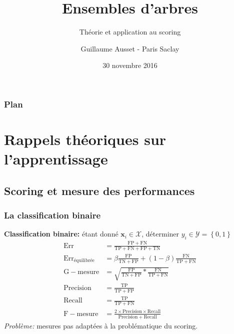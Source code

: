 \documentclass[dvipsnames,10pt]{beamer}
\title{Ensembles d'arbres}
\subtitle{Théorie et application au scoring}
\author{Guillaume Ausset - Paris Saclay}
\institute{M2 MASEF - Crédit Agricole GRO}
\date{30 novembre 2016}
\theoremstyle{plain}
\theoremstyle{definition}
\begin{document}

\begin{frame}
    \titlepage
\end{frame}


\begin{frame}
\frametitle{Plan}
    \vspace{0.2cm}
    \tableofcontents
\end{frame}

\section{Rappels théoriques sur l'apprentissage}
\subsection{Scoring et mesure des performances}

\begin{frame}
\frametitle{La classification binaire}
\textbf{Classification binaire:} étant donné $\mathbf{x}_i \in \mathcal{X}$, déterminer $y_i \in \mathcal{Y} = \left\{0,1\right\}$
\begin{align*}
    \mathrm{Err} &= \frac{\mathrm{FP}+\mathrm{FN}}{\mathrm{TP}+\mathrm{FN}+\mathrm{FP}+\mathrm{TN}} \\
    \mathrm{Err}_\mathrm{équilibrée} &= \beta \frac{\mathrm{FP}}{\mathrm{TN}+\mathrm{FP}} + (1-\beta) \frac{\mathrm{FN}}{\mathrm{TP}+\mathrm{FN}} \\
    \mathrm{G-mesure} &= \sqrt{\frac{\mathrm{FP}}{\mathrm{TN}+\mathrm{FP}} * \frac{\mathrm{FN}}{\mathrm{TP}+\mathrm{FN}}} \\
    \mathrm{Precision} &= \frac{\mathrm{TP}}{\mathrm{TP} + \mathrm{FP}} \\
    \mathrm{Recall} &= \frac{\mathrm{TP}}{\mathrm{TP} + \mathrm{FN}} \\
    \mathrm{F-mesure} &= \frac{2 \times \mathrm{Precision} \times \mathrm{Recall}}{\mathrm{Precision} + \mathrm{Recall}}
\end{align*}
\emph{Problème:} mesures pas adaptées à la problématique du scoring.
\end{frame}
\end{document}
